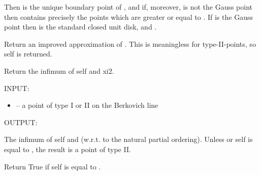 \documentclass[letterpaper,10pt,english]{sphinxmanual}
\begin{document}
\begin{fulllineitems}
\begin{fulllineitems}
Then  is the unique boundary
point of , and if, moreover,  is not the Gauss point then
 contains precisely the points  which are greater or equal to
. If  is the Gauss point then  is the standard
closed unit disk,  and .

\end{fulllineitems}


\begin{fulllineitems}
\label{berkovich_line:mclf.berkovich.berkovich_line.TypeIIPointOnBerkovichLine.improved_approximation}
Return an improved approximation of .
This is meaningless for type-II-points, so self is returned.

\end{fulllineitems}


\begin{fulllineitems}
\label{berkovich_line:mclf.berkovich.berkovich_line.TypeIIPointOnBerkovichLine.infimum}
Return the infimum of self and xi2.

INPUT:
\begin{itemize}
\item {} 
 -- a point of type I or II on the Berkovich line

\end{itemize}

OUTPUT:

The infimum of self and  (w.r.t. to the natural partial ordering).
Unless  or self is equal to ,
the result is a point of type II.

\end{fulllineitems}


\begin{fulllineitems}
\label{berkovich_line:mclf.berkovich.berkovich_line.TypeIIPointOnBerkovichLine.is_equal}
Return True if self is equal to .


\end{fulllineitems}
\end{fulllineitems}
\end{document}
